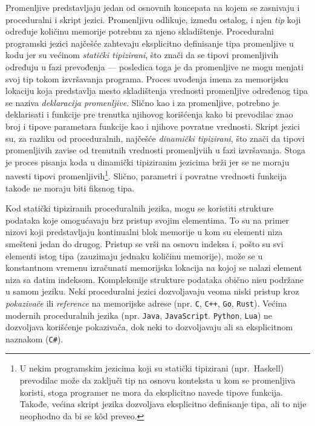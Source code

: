 Promenljive predstavljaju jedan od osnovnih koncepata na kojem se zasnivaju i proceduralni i skript jezici. Promenljivu odlikuje, između ostalog, i njen \emph{tip} koji određuje količinu memorije potrebnu za njeno skladištenje. Proceduralni programski jezici najčešće zahtevaju eksplicitno definisanje tipa promenljive u kodu jer su većinom \emph{statički tipizirani}, što znači da se tipovi promenljivih određuju u fazi prevođenja --- posledica toga je da promenljive ne mogu menjati svoj tip tokom izvršavanja programa. Proces uvođenja imena za memorijsku lokaciju koja predstavlja mesto skladištenja vrednosti promenljive određenog tipa se naziva \emph{deklaracija promenljive}. Slično kao i za promenljive, potrebno je deklarisati i funkcije pre trenutka njihovog korišćenja kako bi prevodilac znao broj i tipove parametara funkcije kao i njihove povratne vrednosti. Skript jezici su, za razliku od proceduralnih, najčešće \emph{dinamički tipizirani}, što znači da tipovi promenljivih zavise od trenutnih vrednosti promenljviih u fazi izvršavanja. Stoga je proces pisanja koda u dinamički tipiziranim jezicima brži jer se ne moraju navesti tipovi promenljivih\footnote{U nekim programskim jezicima koji su statički tipizirani (npr.~Haskell) prevodilac može da zaključi tip na osnovu konteksta u kom se promenljiva koristi, stoga programer ne mora da eksplicitno navede tipove funkcija. Takođe, većina skript jezika dozvoljava eksplicitno definisanje tipa, ali to nije neophodno da bi se k\^od preveo.}. Slično, parametri i povratne vrednosti funkcija takođe ne moraju biti fiksnog tipa.

Kod statički tipiziranih proceduralnih jezika, mogu se koristiti strukture podataka koje omogućavaju brz pristup svojim elementima. To su na primer nizovi koji predstavljaju kontinualni blok memorije u kom su elementi niza smešteni jedan do drugog. Pristup se vrši na osnovu indeksa i, pošto su svi elementi istog tipa (zauzimaju jednaku količinu memorije), može se u konstantnom vremenu izračunati memorijska lokacija na kojoj se nalazi element niza sa datim indeksom. Kompleksnije strukture podataka obično nisu podržane u samom jeziku. Neki proceduralni jezici dozvoljavaju veoma niski pristup kroz \emph{pokazivače} ili \emph{reference} na memorijske adrese (npr. \texttt{C}, \texttt{C++}, \texttt{Go}, \texttt{Rust}). Većina modernih proceduralnih jezika (npr. \texttt{Java}, \texttt{JavaScript}. \texttt{Python}, \texttt{Lua}) ne dozvoljava korišćenje pokazivača, dok neki to dozvoljavaju ali sa eksplicitnom naznakom (\texttt{C\#}).

